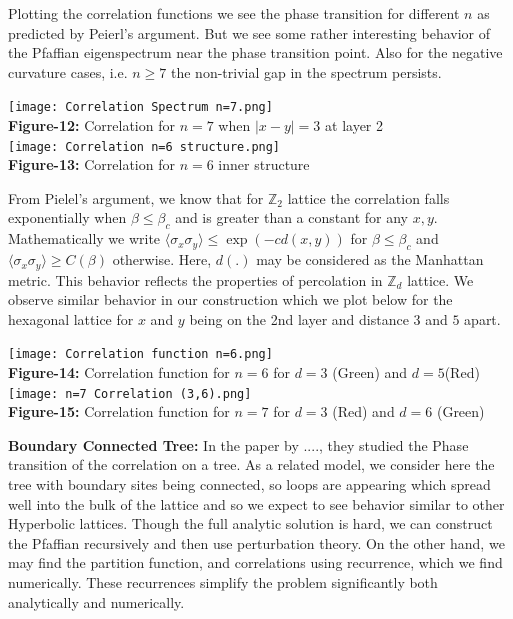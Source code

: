 \documentclass{article}
\begin{document}
	Plotting the correlation functions we see the phase transition for different $n$ as predicted by Peierl's argument. But we see some rather interesting behavior of the Pfaffian eigenspectrum near the phase transition point. Also for the negative curvature cases, i.e. $n \geq 7$ the non-trivial gap in the spectrum persists.
	
	\begin{center}
		\texttt{[image: Correlation Spectrum n=7.png]}\\
		\textbf{Figure-12:} Correlation for $n=7$ when $|x-y|=3$ at layer 2\\
		
		\texttt{[image: Correlation n=6 structure.png]}\\
		\textbf{Figure-13:} Correlation for $n=6$ inner structure\\
	\end{center}
	
	From Pielel's argument, we know that for $\mathbb{Z}_2$ lattice the correlation falls exponentially when $\beta \leq \beta_c$ and is greater than a constant for any $x,y$. Mathematically we write $\langle \sigma_x \sigma_y \rangle \leq \exp(-c d(x,y))$ for $\beta \leq \beta_c$ and $\langle \sigma_x \sigma_y \rangle \geq C(\beta)$ otherwise. Here, $d(.)$ may be considered as the Manhattan metric. This behavior reflects the properties of percolation in $\mathbb{Z}_d$ lattice. We observe similar behavior in our construction which we plot below for the hexagonal lattice for $x$ and $y$ being on the 2nd layer and distance $3$ and $5$ apart.\\
	\begin{center}
		
		\texttt{[image: Correlation function n=6.png]}\\
		\textbf{Figure-14:} Correlation function for $n=6$ for $d=3$ (Green) and $d=5$(Red)\\
		
		\texttt{[image: n=7 Correlation (3,6).png]}\\
		\textbf{Figure-15:} Correlation function for $n=7$ for $d=3$ (Red) and $d=6$ (Green)\\
		
	\end{center}
	
	\textbf{Boundary Connected Tree:} In the paper by ...., they studied the Phase transition of the correlation on a tree. As a related model, we consider here the tree with boundary sites being connected, so loops are appearing which spread well into the bulk of the lattice and so we expect to see behavior similar to other Hyperbolic lattices. Though the full analytic solution is hard, we can construct the Pfaffian recursively and then use perturbation theory. On the other hand, we may find the partition function, and correlations using recurrence, which we find numerically. These recurrences simplify the problem significantly both analytically and numerically. \\
	
\end{document}
